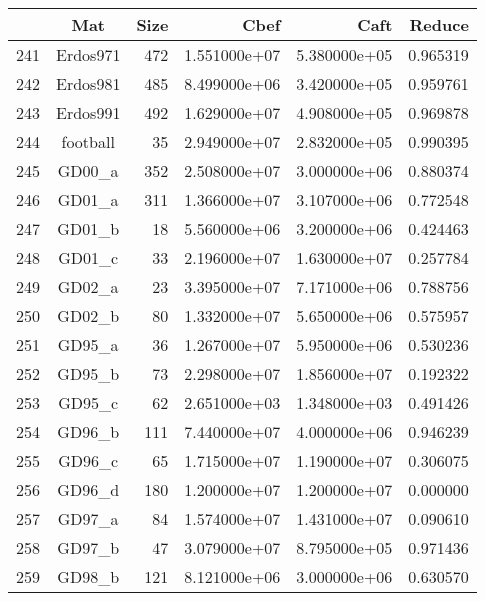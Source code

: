 \documentclass[8pt]{report}
\begin{document}
	\begin{table*}
	\center
		\begin{tabular}{|l|c|r|r|r|r|}
\toprule
{} &                      Mat &  Size &          Cbef &          Caft &    Reduce \\
\midrule
241 &                 Erdos971 &   472 &  1.551000e+07 &  5.380000e+05 &  0.965319 \\
242 &                 Erdos981 &   485 &  8.499000e+06 &  3.420000e+05 &  0.959761 \\
243 &                 Erdos991 &   492 &  1.629000e+07 &  4.908000e+05 &  0.969878 \\
244 &                 football &    35 &  2.949000e+07 &  2.832000e+05 &  0.990395 \\
245 &                   GD00\_a &   352 &  2.508000e+07 &  3.000000e+06 &  0.880374 \\
246 &                   GD01\_a &   311 &  1.366000e+07 &  3.107000e+06 &  0.772548 \\
247 &                   GD01\_b &    18 &  5.560000e+06 &  3.200000e+06 &  0.424463 \\
248 &                   GD01\_c &    33 &  2.196000e+07 &  1.630000e+07 &  0.257784 \\
249 &                   GD02\_a &    23 &  3.395000e+07 &  7.171000e+06 &  0.788756 \\
250 &                   GD02\_b &    80 &  1.332000e+07 &  5.650000e+06 &  0.575957 \\
251 &                   GD95\_a &    36 &  1.267000e+07 &  5.950000e+06 &  0.530236 \\
252 &                   GD95\_b &    73 &  2.298000e+07 &  1.856000e+07 &  0.192322 \\
253 &                   GD95\_c &    62 &  2.651000e+03 &  1.348000e+03 &  0.491426 \\
254 &                   GD96\_b &   111 &  7.440000e+07 &  4.000000e+06 &  0.946239 \\
255 &                   GD96\_c &    65 &  1.715000e+07 &  1.190000e+07 &  0.306075 \\
256 &                   GD96\_d &   180 &  1.200000e+07 &  1.200000e+07 &  0.000000 \\
257 &                   GD97\_a &    84 &  1.574000e+07 &  1.431000e+07 &  0.090610 \\
258 &                   GD97\_b &    47 &  3.079000e+07 &  8.795000e+05 &  0.971436 \\
259 &                   GD98\_b &   121 &  8.121000e+06 &  3.000000e+06 &  0.630570 \\

\end{tabular}
\end{table*}
\end{document}
